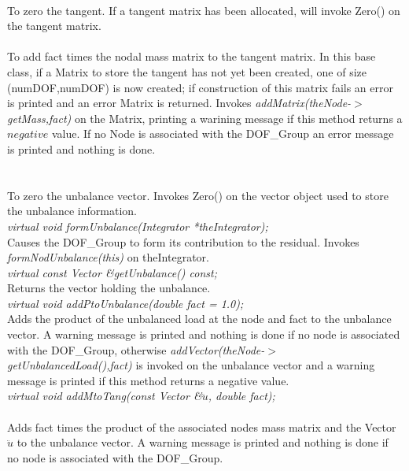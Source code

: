 \\
To zero the tangent. If a tangent matrix has been allocated,
will invoke Zero() on the tangent matrix.\\

\\
To add \p fact times the nodal mass matrix to the tangent
matrix. In this base class, if a Matrix to store the tangent has not
yet been created, one of size (numDOF,numDOF) is now created; if
construction of this matrix fails an error is printed and an error
Matrix is returned. Invokes {\em addMatrix(theNode-$>$getMass,fact)}
on the Matrix, printing a warining message if this method returns a
$negative$ value. If no Node is associated with the DOF\_Group an
error message is printed and nothing is done. \\

  \\
\\
To zero the unbalance vector. Invokes Zero() on the vector
object used to store the unbalance information. \\

{\em virtual void formUnbalance(Integrator *theIntegrator); }\\
Causes the DOF\_Group to form its contribution to the residual. Invokes
{\em formNodUnbalance(this)} on \p theIntegrator.\\

{\em virtual const Vector \&getUnbalance() const; } \\
Returns the vector holding the unbalance. \\

{\em virtual void  addPtoUnbalance(double fact = 1.0);} \\
Adds the product of the unbalanced load at the node and \p fact to
the unbalance vector. A warning message is printed and nothing is done
if no node is associated with the DOF\_Group, otherwise {\em
addVector(theNode-$>$getUnbalancedLoad(),fact)} is invoked on the
unbalance vector and a warning message is printed if this method
returns a negative value. \\ 

{\em virtual void addMtoTang(const Vector \&$\ddot u$,
double fact);}\\ \\ 
Adds \p fact times the product of the associated nodes mass matrix
and the Vector $\ddot u$ to the unbalance vector. A warning message is
printed and nothing is done if no node is associated with the
DOF\_Group. \\


